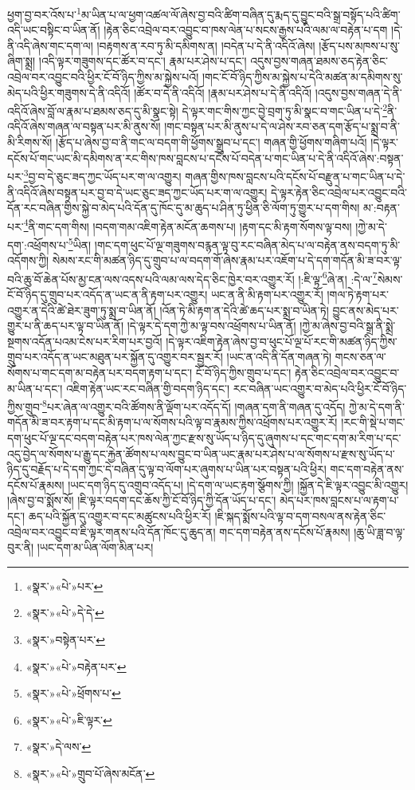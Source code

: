 ཕྱག་བྱ་བར་འོས་པ་\footnote{«སྣར་»«པེ་»པར་}མ་ཡིན་པ་ལ་ཕྱག་འཚལ་ལོ་ཞེས་བྱ་བའི་ཚིག་བཞིན་དུ་རྨད་དུ་བྱུང་བའི་སྒྲ་བསྟོད་པའི་ཚིག་འདི་ཡང་བསྟིང་བ་ཡིན་ནོ། །རྟེན་ཅིང་འབྲེལ་བར་འབྱུང་བ་ཁས་ལེན་པ་སངས་རྒྱས་པའི་ལམ་ལ་བརྟེན་པ་དག །དེ་ནི་འདི་ཞེས་གང་དག་ལ། །བརྟགས་ན་རབ་ཏུ་མི་དམིགས་ན། །བདེན་པ་དེ་ནི་འདིའོ་ཞེས། །རྩོད་པས་མཁས་པ་སུ་ཞིག་སྨྲ། །འདི་ལྟར་གཟུགས་དང་ཚོར་བ་དང་། རྣམ་པར་ཤེས་པ་དང་། འདུས་བྱས་གཞན་ཐམས་ཅད་རྟེན་ཅིང་འབྲེལ་བར་འབྱུང་བའི་ཕྱིར་ངོ་བོ་ཉིད་ཀྱིས་མ་སྐྱེས་པའོ། །གང་ངོ་བོ་ཉིད་ཀྱིས་མ་སྐྱེས་པ་དེའི་མཚན་མ་དམིགས་སུ་མེད་པའི་ཕྱིར་གཟུགས་དེ་ནི་འདིའོ། །ཚོར་བ་དེ་ནི་འདིའོ། །རྣམ་པར་ཤེས་པ་དེ་ནི་འདིའོ། །འདུས་བྱས་གཞན་དེ་ནི་འདིའོ་ཞེས་བློ་ལ་རྣམ་པ་ཐམས་ཅད་དུ་མི་སྣང་སྟེ། དེ་ལྟར་གང་གིས་ཀྱང་བྱེ་བྲག་ཏུ་མི་སྣང་བ་གང་ཡིན་པ་དེ་\footnote{«སྣར་»«པེ་»དེ་དེ་}ནི་འདིའོ་ཞེས་གཞན་ལ་བསྟན་པར་མི་ནུས་སོ། །གང་བསྟན་པར་མི་ནུས་པ་དེ་ལ་ཤེས་རབ་ཅན་དག་རྩོད་པ་སྨྲ་བ་ནི་མི་རིགས་སོ། །རྩོད་པ་ཞེས་བྱ་བ་ནི་གང་ལ་བདག་གི་ཕྱོགས་སྒྲུབ་པ་དང་། གཞན་གྱི་ཕྱོགས་གཞིག་པའོ། །དེ་ལྟར་དངོས་པོ་གང་ཡང་མི་དམིགས་ན་རང་གིས་ཁས་བླངས་པ་དངོས་པོ་བདེན་པ་གང་ཡིན་པ་དེ་ནི་འདིའོ་ཞེས་:བསྟན་པར་\footnote{«སྣར་»བསྟེན་པར་}བྱ་བ་དེ་ཅུང་ཟད་ཀྱང་ཡོད་པར་ག་ལ་འགྱུར། གཞན་གྱིས་ཁས་བླངས་པའི་དངོས་པོ་བརྫུན་པ་གང་ཡིན་པ་དེ་ནི་འདིའོ་ཞེས་བསྟན་པར་བྱ་བ་དེ་ཡང་ཅུང་ཟད་ཀྱང་ཡོད་པར་ག་ལ་འགྱུར། དེ་ལྟར་རྟེན་ཅིང་འབྲེལ་པར་འབྱུང་བའི་དོན་རང་བཞིན་གྱིས་སྐྱེ་བ་མེད་པའི་དོན་དུ་ཁོང་དུ་མ་ཆུད་པ་ཤིན་ཏུ་ཕྱིན་ཅི་ལོག་ཏུ་གྱུར་པ་དག་གིས། མ་:བརྟན་པར་\footnote{«སྣར་»«པེ་»བརྟེན་པར་}ནི་གང་དག་གིས། །བདག་གམ་འཇིག་རྟེན་མངོན་ཆགས་པ། །རྟག་དང་མི་རྟག་སོགས་ལྟ་བས། །ཀྱེ་མ་དེ་དག་:འཕྲོགས་པ་\footnote{«སྣར་»«པེ་»ཕྲོགས་པ་}ཡིན། །གང་དག་ཕུང་པོ་ལྔ་གཟུགས་བརྙན་ལྟ་བུ་རང་བཞིན་མེད་པ་ལ་བརྟེན་ནས་བདག་ཏུ་མི་འདོགས་ཀྱི། སེམས་རང་གི་མཚན་ཉིད་དུ་གྲུབ་པ་ལ་བདག་གོ་ཞེས་རྣམ་པར་འཇོག་པ་དེ་དག་གདོན་མི་ཟ་བར་ལྟ་བའི་ཆུ་བོ་ཆེན་པོས་མྱ་ངན་ལས་འདས་པའི་ལམ་ལས་དེད་ཅིང་ཁྱེར་བར་འགྱུར་རོ། །:ཇི་ལྟ་\footnote{«སྣར་»«པེ་»ཇི་ལྟར་}ཞེ་ན། :དེ་ལ་\footnote{«སྣར་»དེ་ལས་}སེམས་ངོ་བོ་ཉིད་དུ་གྲུབ་པར་འདོད་ན་ཡང་ན་ནི་རྟག་པར་འགྱུར། ཡང་ན་ནི་མི་རྟག་པར་འགྱུར་རོ། །གལ་ཏེ་རྟག་པར་འགྱུར་ན་དེའི་ཚེ་ཐེར་ཟུག་ཏུ་སྨྲ་བ་ཡིན་ནོ། །འོན་ཏེ་མི་རྟག་ན་དེའི་ཚེ་ཆད་པར་སྨྲ་བ་ཡིན་ཏེ། བྱུང་ནས་མེད་པར་གྱུར་པ་ནི་ཆད་པར་ལྟ་བ་ཡིན་ནོ། །དེ་ལྟར་དེ་དག་ཀྱེ་མ་ལྟ་བས་འཕྲོགས་པ་ཡིན་ནོ། །ཀྱེ་མ་ཞེས་བྱ་བའི་སྒྲ་ནི་སྨྲེ་སྔགས་འདོན་པའམ་ངེས་པར་རིག་པར་བྱའོ། །དེ་ལྟར་འཇིག་རྟེན་ཞེས་བྱ་བ་ཕུང་པོ་ལྔ་པོ་རང་གི་མཚན་ཉིད་ཀྱིས་གྲུབ་པར་འདོད་ན་ཡང་མཐུན་པར་སྐྱོན་དུ་འགྱུར་བར་སྦྱར་རོ། །ཡང་ན་འདི་ནི་དོན་གཞན་ཏེ། གངས་ཅན་ལ་སོགས་པ་གང་དག་མ་བརྟེན་པར་བདག་རྟག་པ་དང་། ངོ་བོ་ཉིད་ཀྱིས་གྲུབ་པ་དང་། རྟེན་ཅིང་འབྲེལ་བར་འབྱུང་བ་མ་ཡིན་པ་དང་། འཇིག་རྟེན་ཡང་རང་བཞིན་གྱི་བདག་ཉིད་དང་། རང་བཞིན་ཡང་འགྱུར་བ་མེད་པའི་ཕྱིར་ངོ་བོ་ཉིད་ཀྱིས་གྲུབ་\footnote{«སྣར་»«པེ་»གྲུབ་པོ་ཞེས་མངོན་}པར་ཞེན་ལ་འགྱུར་བའི་ཚོགས་ནི་ལྡོག་པར་འདོད་དོ། །གཞན་དག་ནི་གཞན་དུ་འདོད། ཀྱེ་མ་དེ་དག་ནི་གདོན་མི་ཟ་བར་རྟག་པ་དང་མི་རྟག་པ་ལ་སོགས་པའི་ལྟ་བ་རྣམས་ཀྱིས་འཕྲོགས་པར་འགྱུར་རོ། །རང་གི་སྡེ་པ་གང་དག་ཕུང་པོ་ལྔ་དང་བདག་བརྟེན་པར་ཁས་ལེན་ཀྱང་རྫས་སུ་ཡོད་པ་ཉིད་དུ་ཞུགས་པ་དང་གང་དག་མ་རིག་པ་དང་འདུ་བྱེད་ལ་སོགས་པ་རྒྱུ་དང་རྐྱེན་ཚོགས་པ་ལས་བྱུང་བ་ཡིན་ཡང་རྣམ་པར་ཤེས་པ་ལ་སོགས་པ་རྫས་སུ་ཡོད་པ་ཉིད་དུ་བརྗོད་པ་དེ་དག་ཀྱང་དེ་བཞིན་དུ་ལྟ་བ་ལོག་པར་ཞུགས་པ་ཡིན་པར་བསྟན་པའི་ཕྱིར། གང་དག་བརྟེན་ནས་དངོས་པོ་རྣམས། །ཡང་དག་ཉིད་དུ་འགྲུབ་འདོད་པ། །དེ་དག་ལ་ཡང་རྟག་སྩོགས་ཀྱི། །སྐྱོན་དེ་ཇི་ལྟར་འབྱུང་མི་འགྱུར། །ཞེས་བྱ་བ་སྨོས་སོ། །ཇི་ལྟར་བདག་དང་ཆོས་ཀྱི་ངོ་བོ་ཉིད་ཀྱི་དོན་ཡོད་པ་དང་། མེད་པར་ཁས་བླངས་པ་ལ་རྟག་པ་དང་། ཆད་པའི་སྐྱོན་དུ་འགྱུར་བ་དང་མཚུངས་པའི་ཕྱིར་རོ། །ཇི་སྐད་སྨོས་པའི་ལྟ་བ་དག་བསལ་ནས་རྟེན་ཅིང་འབྲེལ་བར་འབྱུང་བ་ཇི་ལྟར་གནས་པའི་དོན་ཁོང་དུ་ཆུད་ན། གང་དག་བརྟེན་ནས་དངོས་པོ་རྣམས། །ཆུ་ཡི་ཟླ་བ་ལྟ་བུར་ནི། །ཡང་དག་མ་ཡིན་ལོག་མིན་པར། 